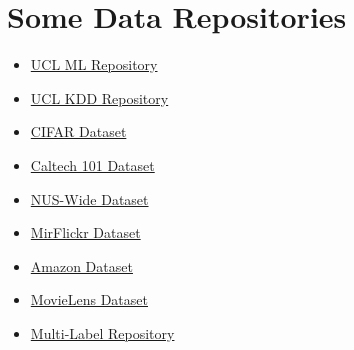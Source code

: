 \documentclass[10pt]{article}
\begin{document}
\section{Some Data Repositories}
\begin{itemize}
	\item \href{https://archive.ics.uci.edu/ml/index.php}{UCL ML Repository}
	\item \href{https://kdd.ics.uci.edu/}{UCL KDD Repository}
	\item \href{https://www.cs.toronto.edu/~kriz/cifar.html}{CIFAR Dataset}
	\item \href{http://www.vision.caltech.edu/Image_Datasets/Caltech101/}{Caltech 101 Dataset}
	\item \href{https://lms.comp.nus.edu.sg/wp-content/uploads/2019/research/nuswide/NUS-WIDE.html}{NUS-Wide Dataset}
	\item \href{https://press.liacs.nl/mirflickr/}{MirFlickr Dataset}
	\item \href{http://jmcauley.ucsd.edu/data/amazon/}{Amazon Dataset}
	\item \href{https://grouplens.org/datasets/movielens/}{MovieLens Dataset}
	\item \href{http://mulan.sourceforge.net/datasets-mlc.html}{Multi-Label Repository}
\end{itemize}
\end{document}
